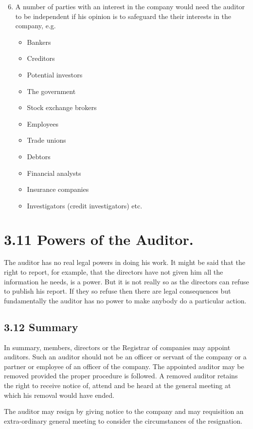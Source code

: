 \documentclass[10pt]{article}
\begin{document}
\begin{enumerate}
  \setcounter{enumi}{5}
  \item A number of parties with an interest in the company would need the auditor to be independent if his opinion is to safeguard the their interests in the company, e.g.
  \begin{itemize}
  	\item Bankers
  	\item Creditors
  	\item Potential investors
  	\item The government
  	\item Stock exchange brokers
  	\item Employees
  	\item Trade unions
  	\item Debtors
  	\item Financial analysts
  	\item Insurance companies
  	\item Investigators (credit investigators) etc.
  \end{itemize}
\end{enumerate}


\section*{3.11 Powers of the Auditor.}
The auditor has no real legal powers in doing his work. It might be said that the right to report, for example, that the directors have not given him all the information he needs, is a power. But it is not really so as the directors can refuse to publish his report. If they so refuse then there are legal consequences but fundamentally the auditor has no power to make anybody do a particular action.

\subsection*{3.12 Summary}
In summary, members, directors or the Registrar of companies may appoint auditors. Such an auditor should not be an officer or servant of the company or a partner or employee of an officer of the company. The appointed auditor may be removed provided the proper procedure is followed. A removed auditor retains the right to receive notice of, attend and be heard at the general meeting at which his removal would have ended.

The auditor may resign by giving notice to the company and may requisition an extra-ordinary general meeting to consider the circumstances of the resignation.
\end{document}
